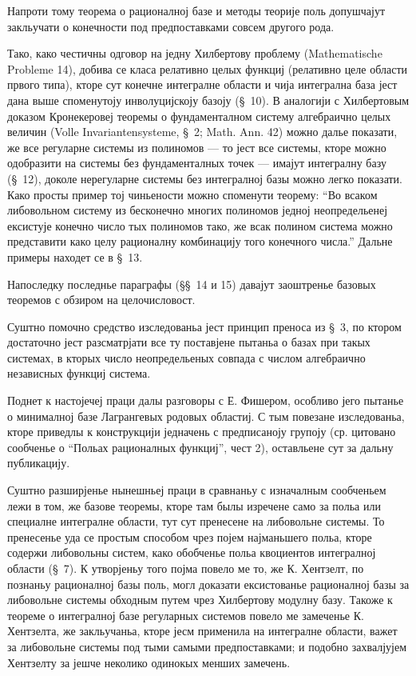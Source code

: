 ﻿\documentclass[11pt]{article}
\begin{document}
Напроти тому теорема о рационалној базе и методы теорије поль допушчајут закльучати о конечности под предпоставками совсем другого рода.

Тако, како честичны одговор на једну Хилбертову проблему (Mathematische Probleme 14), добива се класа релативно целых функциј (релативно целе области првого типа), кторе сут конечне интегралне области и чија интегрална база јест дана выше споменутоју инволуцијскоју базоју (\S\ 10). В аналогији с Хилбертовым доказом Кронекеровеј теоремы о фундаменталном систему алгебраично целых величин (Volle Invariantensysteme, \S\ 2; Math. Ann. 42) можно далье показати, же все регуларне системы из полиномов --- то јест все системы, кторе можно одобразити на системы без фундаменталных точек --- имајут интегралну базу (\S\ 12), доколе нерегуларне системы без интегралној базы можно легко показати. Како просты пример тој чиньености можно споменути теорему: ``Во всаком либовольном систему из бесконечно многих полиномов једној неопредельенеј ексистује конечно число тых полиномов тако, же всак полином система можно представити како целу рационалну комбинацију того конечного числа.'' Дальне примеры находет се в \S\ 13.

Напоследку последнье параграфы (\S\S\ 14 и 15) давајут заоштренье базовых теоремов с обзиром на целочисловост.

Суштно помочно средство изследованьа јест принцип преноса из \S\ 3, по ктором достаточно јест разсматрјати все ту поставјене пытаньа о базах при такых системах, в кторых число неопредельеных совпада с числом алгебраично независных функциј система.

Поднет к настојечеј праци далы разговоры с Е. Фишером, особливо јего пытанье о минималној базе Лагрангевых родовых областиј. С тым повезане изследованьа, кторе приведлы к конструкцији једначень с предписаноју групоју (ср. цитовано сообченье о ``Польах рационалных функциј'', чест 2), оставльене сут за дальну публикацију.

Суштно разширјенье нынешньеј праци в сравнаньу с изначалным сообченьем лежи в том, же базове теоремы, кторе там былы изречене само за польа или специалне интегралне области, тут сут пренесене на либовольне системы. То пренесенье уда се простым способом чрез појем најманьшего польа, кторе содержи либовольны систем, како обобченье польа квоциентов интегралној области (\S\ 7). К утворјеньу того појма повело ме то, же К. Хентзелт, по познаньу рационалној базы поль, могл доказати ексистованье рационалној базы за либовольне системы обходным путем чрез Хилбертову модулну базу. Такоже к теореме о интегралној базе регуларных системов повело ме замеченье К. Хентзелта, же закльучаньа, кторе јесм применила на интегралне области, важет за либовольне системы под тыми самыми предпоставками; и подобно захвалјујем Хентзелту за јешче неколико одинокых менших замечень.
\end{document}
